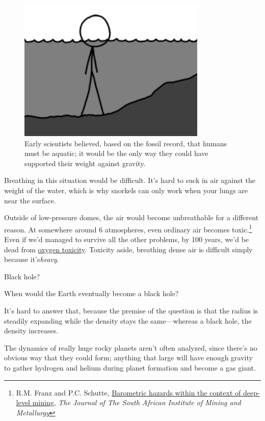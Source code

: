 {\begin{figure}[!htbp]
\centering
\includegraphics[scale=0.5, max width=0.8\textwidth]{imgs/a/67/expanding_water.png}
\caption{Early scientists believed, based on the fossil record, that humans must be aquatic; it would be the only way they could have supported their weight against gravity.}
\end{figure}

{Breathing in this situation would be difficult. It's hard to suck in air against the weight of the water, which is why snorkels can only work when your lungs are near the surface.}

{Outside of low-pressure domes, the air would become unbreathable for a different reason. At somewhere around 6 atmospheres, even ordinary air becomes toxic.{\footnote{R.M. Franz and P.C. Schutte, \href{http://www.saimm.co.za/Journal/v105n06p387.pdf}{Barometric hazards within the context of deep-level mining}, \emph{The Journal of The South African Institute of Mining and Metallurgy} } } Even if we'd managed to survive all the other problems, by 100 years, we'd be dead from \href{https://en.wikipedia.org/wiki/Oxygen\_toxicity} {oxygen toxicity}. Toxicity aside, breathing dense air is difficult simply because it's\emph{heavy}.}

{Black hole?}

{When would the Earth eventually become a black hole?}

{It's hard to answer that, because the premise of the question is that the radius is steadily expanding while the density stays the same—whereas a black hole, the density increases.}

{The dynamics of really huge rocky planets aren't often analyzed, since there's no obvious way that they could form; anything that large will have enough gravity to gather hydrogen and helium during planet formation and become a gas giant.}

}
